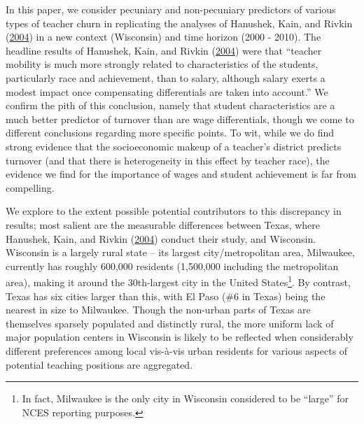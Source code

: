\documentclass[12pt,]{article}
\let\rmarkdownfootnote\footnote%
\def\footnote{\protect\rmarkdownfootnote}
\begin{document}
In this paper, we consider pecuniary and non-pecuniary predictors of
various types of teacher churn in replicating the analyses of Hanushek,
Kain, and Rivkin (\protect\hyperlink{ref-hanushek}{2004}) in a new
context (Wisconsin) and time horizon (2000 - 2010). The headline results
of Hanushek, Kain, and Rivkin (\protect\hyperlink{ref-hanushek}{2004})
were that ``teacher mobility is much more strongly related to
characteristics of the students, particularly race and achievement, than
to salary, although salary exerts a modest impact once compensating
differentials are taken into account.'' We confirm the pith of this
conclusion, namely that student characteristics are a much better
predictor of turnover than are wage differentials, though we come to
different conclusions regarding more specific points. To wit, while we
do find strong evidence that the socioeconomic makeup of a teacher's
district predicts turnover (and that there is heterogeneity in this
effect by teacher race), the evidence we find for the importance of
wages and student achievement is far from compelling.

We explore to the extent possible potential contributors to this
discrepancy in results; most salient are the measurable differences
between Texas, where Hanushek, Kain, and Rivkin
(\protect\hyperlink{ref-hanushek}{2004}) conduct their study, and
Wisconsin. Wisconsin is a largely rural state -- its largest
city/metropolitan area, Milwaukee, currently has roughly 600,000
residents (1,500,000 including the metropolitan area), making it around
the 30th-largest city in the United States\footnote{In fact, Milwaukee
  is the only city in Wisconsin considered to be ``large'' for NCES
  reporting purposes.}. By contrast, Texas has six cities larger than
this, with El Paso (\#6 in Texas) being the nearest in size to
Milwaukee. Though the non-urban parts of Texas are themselves sparsely
populated and distinctly rural, the more uniform lack of major
population centers in Wisconsin is likely to be reflected when
considerably different preferences among local vis-à-vis urban residents
for various aspects of potential teaching positions are aggregated.
\end{document}
